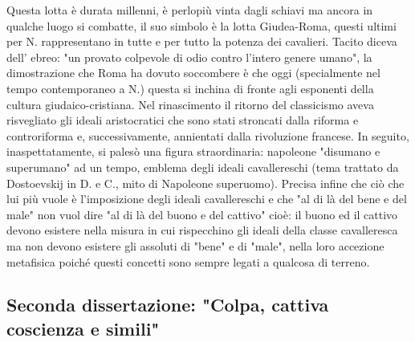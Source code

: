 \documentclass[10pt,a4paper]{article}
\begin{document}
Questa lotta è durata millenni, è perlopiù vinta dagli schiavi ma ancora in qualche luogo si combatte, il suo simbolo è la lotta Giudea-Roma, questi ultimi per N. rappresentano in tutte e per tutto la potenza dei cavalieri. Tacito diceva dell' ebreo: "un provato colpevole di odio contro l'intero genere umano", la dimostrazione che Roma ha dovuto soccombere è che oggi (specialmente nel tempo contemporaneo a N.) questa si inchina di fronte agli esponenti della cultura giudaico-cristiana. Nel rinascimento il ritorno del classicismo aveva risvegliato gli ideali aristocratici che sono stati stroncati dalla riforma e controriforma e, successivamente, annientati dalla rivoluzione francese. In seguito, inaspettatamente, si palesò una figura straordinaria: napoleone "disumano e superumano" ad un tempo, emblema degli ideali cavallereschi (tema trattato da Dostoevskij in D. e C., mito di Napoleone superuomo). Precisa infine che ciò che lui più vuole è l'imposizione degli ideali cavallereschi e che "al di là del bene e del male" non vuol dire "al di là del buono e del cattivo" cioè: il buono ed il cattivo devono esistere nella misura in cui rispecchino gli ideali della classe cavalleresca ma non devono esistere gli assoluti di "bene" e di "male", nella loro accezione metafisica poiché questi concetti sono sempre legati a qualcosa di terreno. 
\newpage
\subsection{Seconda dissertazione: "Colpa, cattiva coscienza e simili"}
\end{document}
